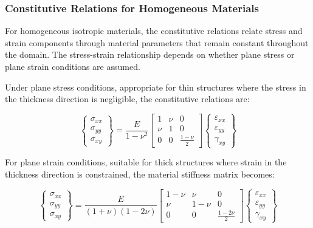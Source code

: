 \documentclass[12pt,a4paper]{report}
\begin{document}
\subsubsection{Constitutive Relations for Homogeneous Materials}

For homogeneous isotropic materials, the constitutive relations relate stress and strain components through material parameters that remain constant throughout the domain. The stress-strain relationship depends on whether plane stress or plane strain conditions are assumed.

Under plane stress conditions, appropriate for thin structures where the stress in the thickness direction is negligible, the constitutive relations are:

\begin{equation}
\begin{Bmatrix} 
\sigma_{xx} \\ 
\sigma_{yy} \\ 
\sigma_{xy} 
\end{Bmatrix} 
= \frac{E}{1-\nu^2} 
\begin{bmatrix} 
1 & \nu & 0 \\ 
\nu & 1 & 0 \\ 
0 & 0 & \frac{1-\nu}{2} 
\end{bmatrix} 
\begin{Bmatrix} 
\varepsilon_{xx} \\ 
\varepsilon_{yy} \\ 
\gamma_{xy} 
\end{Bmatrix}
\end{equation}

For plane strain conditions, suitable for thick structures where strain in the thickness direction is constrained, the material stiffness matrix becomes:

\begin{equation}
\begin{Bmatrix} 
\sigma_{xx} \\ 
\sigma_{yy} \\ 
\sigma_{xy} 
\end{Bmatrix} 
= \frac{E}{(1+\nu)(1-2\nu)} 
\begin{bmatrix} 
1-\nu & \nu & 0 \\ 
\nu & 1-\nu & 0 \\ 
0 & 0 & \frac{1-2\nu}{2} 
\end{bmatrix} 
\begin{Bmatrix} 
\varepsilon_{xx} \\ 
\varepsilon_{yy} \\ 
\gamma_{xy} 
\end{Bmatrix}
\end{equation}
\end{document}
